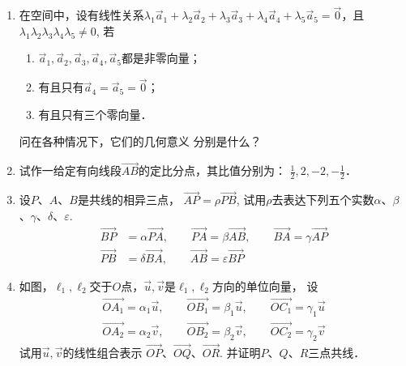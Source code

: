 \begin{enumerate}

\item 在空间中，设有线性关系$\lambda_1\vec{a}_1+\lambda_2\vec{a}_2+\lambda_3\vec{a}_3+\lambda_4\vec{a}_4+\lambda_5\vec{a}_5=\vec{0}$，且$\lambda_1\lambda_2\lambda_3\lambda_4\lambda_5\ne 0$, 若
\begin{enumerate}
    \item $\vec{a}_1,\vec{a}_2,\vec{a}_3,\vec{a}_4,\vec{a}_5$都是非零向量；
    \item 有且只有$\vec{a}_4=\vec{a}_5=\vec{0}$；
    \item 有且只有三个零向量．
\end{enumerate}
问在各种情况下，它们的几何意义
分别是什么？
\item 试作一给定有向线段$\Vec{AB}$的定比分点，其比值分别为：
$\frac{1}{2},2,-2,-\frac{1}{2}$．
\item 设$P$、$A$、$B$是共线的相异三点，
$\Vec{AP}=\rho\Vec{PB}$, 
试用$\rho$去表达下列五个实数$\alpha$、$\beta$、$\gamma$、$\delta$、$\varepsilon$.
\[\begin{split}
    \Vec{BP}&=\alpha\Vec{PA},\qquad \Vec{PA}=\beta\Vec{AB},\qquad \Vec{BA}=\gamma\Vec{AP}\\
    \Vec{PB}&=\delta\Vec{BA},\qquad \Vec{AB}=\varepsilon\Vec{BP}
\end{split}\]
\item 如图，$\ell_1,\ell_2$交于$O$点，$\vec{u},\vec{v}$是$\ell_1,\ell_2$方向的单位向量，
设
\[\begin{split}
    \Vec{OA_1}=\alpha_1\vec{u},\qquad  \Vec{OB_1}=\beta_1\vec{u},\qquad  \Vec{OC_1}=\gamma_1\vec{u}\\
    \Vec{OA_2}=\alpha_2\vec{v},\qquad  \Vec{OB_2}=\beta_2\vec{v},\qquad  \Vec{OC_2}=\gamma_2\vec{v}
\end{split}\]
试用$\vec{u},\vec{v}$的线性组合表示
$\Vec{OP}$、$\Vec{OQ}$、$\Vec{OR}$. 并证明$P$、$Q$、$R$三点共线．

\begin{figure}[htp]
    \centering
{}
\end{figure}
\end{enumerate}
